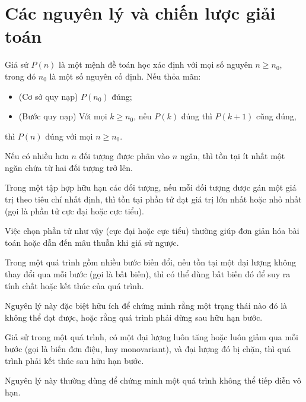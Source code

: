 \documentclass[../imo-training-open-book.tex]{subfiles}
\begin{document}
\section{Các nguyên lý và chiến lược giải toán}

\begin{theorem}
    \label{theorem:induction-principle}
    Giả sử \(P(n)\) là một mệnh đề toán học xác định với mọi số nguyên \(n \ge n_0\), trong đó \(n_0\) là một số nguyên cố định. Nếu thỏa mãn:
    \begin{itemize}[topsep=0pt, partopsep=0pt, itemsep=0pt]
        \item (Cơ sở quy nạp) \(P(n_0)\) đúng;
        \item (Bước quy nạp) Với mọi \(k \ge n_0\), nếu \(P(k)\) đúng thì \(P(k+1)\) cũng đúng,
    \end{itemize}
    thì \(P(n)\) đúng với mọi \(n \ge n_0\).
\end{theorem}

\begin{theorem}\label{theorem:pigeonhole-principle}
	Nếu có nhiều hơn \( n \) đối tượng được phân vào \( n \) ngăn, thì tồn tại ít nhất một ngăn chứa từ hai đối tượng trở lên.
\end{theorem}

\begin{theorem}
    \label{theorem:extremal-principle}
    Trong một tập hợp hữu hạn các đối tượng, nếu mỗi đối tượng được gán một giá trị theo tiêu chí nhất định, thì tồn tại phần tử đạt giá trị lớn nhất hoặc nhỏ nhất (gọi là phần tử cực đại hoặc cực tiểu).
    
    Việc chọn phần tử như vậy (cực đại hoặc cực tiểu) thường giúp đơn giản hóa bài toán hoặc dẫn đến mâu thuẫn khi giả sử ngược.
\end{theorem}

\begin{theorem}
    \label{theorem:invariant-principle}
    Trong một quá trình gồm nhiều bước biến đổi, nếu tồn tại một đại lượng không thay đổi qua mỗi bước (gọi là bất biến), thì có thể dùng bất biến đó để suy ra tính chất hoặc kết thúc của quá trình.
    
    Nguyên lý này đặc biệt hữu ích để chứng minh rằng một trạng thái nào đó là không thể đạt được, hoặc rằng quá trình phải dừng sau hữu hạn bước.
\end{theorem}

\begin{theorem}
    \label{theorem:monovariant-principle}
    Giả sử trong một quá trình, có một đại lượng luôn tăng hoặc luôn giảm qua mỗi bước (gọi là biến đơn điệu, hay monovariant), và đại lượng đó bị chặn, thì quá trình phải kết thúc sau hữu hạn bước.
    
    Nguyên lý này thường dùng để chứng minh một quá trình không thể tiếp diễn vô hạn.
\end{theorem}
\end{document}
